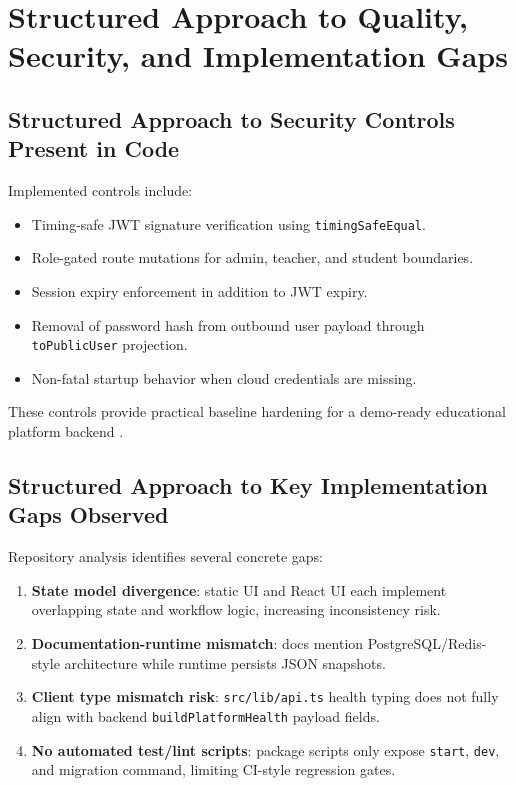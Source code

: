 \section{Structured Approach to Quality, Security, and Implementation Gaps}

\subsection{Structured Approach to Security Controls Present in Code}

Implemented controls include:
\begin{itemize}[leftmargin=1.5em]
  \item Timing-safe JWT signature verification using \texttt{timingSafeEqual}.
  \item Role-gated route mutations for admin, teacher, and student boundaries.
  \item Session expiry enforcement in addition to JWT expiry.
  \item Removal of password hash from outbound user payload through \texttt{toPublicUser} projection.
  \item Non-fatal startup behavior when cloud credentials are missing.
\end{itemize}

These controls provide practical baseline hardening for a demo-ready educational platform backend \cite{repo-security,repo-server-modules}.

\subsection{Structured Approach to Key Implementation Gaps Observed}

Repository analysis identifies several concrete gaps:
\begin{enumerate}[leftmargin=1.5em]
  \item \textbf{State model divergence}: static UI and React UI each implement overlapping state and workflow logic, increasing inconsistency risk.
  \item \textbf{Documentation-runtime mismatch}: docs mention PostgreSQL/Redis-style architecture while runtime persists JSON snapshots.
  \item \textbf{Client type mismatch risk}: \texttt{src/lib/api.ts} health typing does not fully align with backend \texttt{buildPlatformHealth} payload fields.
  \item \textbf{No automated test/lint scripts}: package scripts only expose \texttt{start}, \texttt{dev}, and migration command, limiting CI-style regression gates.
\end{enumerate}

